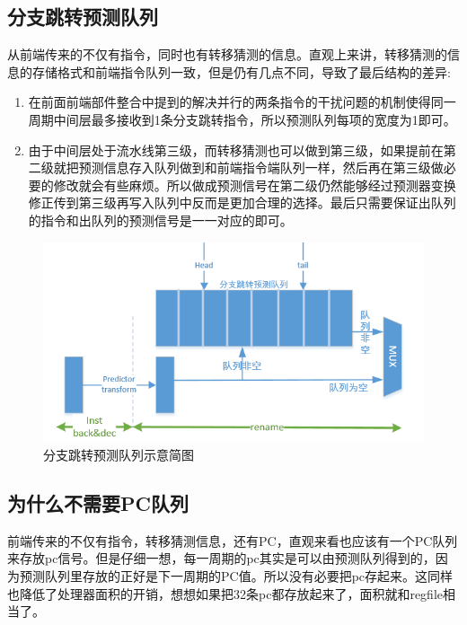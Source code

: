 \documentclass[11pt]{article}
\begin{document}
\subsection{分支跳转预测队列}
从前端传来的不仅有指令，同时也有转移猜测的信息。直观上来讲，转移猜测的信息的存储格式和前端指令队列一致，但是仍有几点不同，导致了最后结构的差异:
\begin{enumerate}
	\item 在前面前端部件整合中提到的解决并行的两条指令的干扰问题的机制使得同一周期中间层最多接收到1条分支跳转指令，所以预测队列每项的宽度为1即可。
	\item 由于中间层处于流水线第三级，而转移猜测也可以做到第三级，如果提前在第二级就把预测信息存入队列做到和前端指令端队列一样，然后再在第三级做必要的修改就会有些麻烦。所以做成预测信号在第二级仍然能够经过预测器变换修正传到第三级再写入队列中反而是更加合理的选择。最后只需要保证出队列的指令和出队列的预测信号是一一对应的即可。
\end{enumerate}
\begin{figure}[H]
	\centering
	\includegraphics[width=0.7\linewidth]{figs/predqueue.png}
	\caption{分支跳转预测队列示意简图}
\end{figure}
\subsection{为什么不需要PC队列}
前端传来的不仅有指令，转移猜测信息，还有PC，直观来看也应该有一个PC队列来存放pc信号。但是仔细一想，每一周期的pc其实是可以由预测队列得到的，因为预测队列里存放的正好是下一周期的PC值。所以没有必要把pc存起来。这同样也降低了处理器面积的开销，想想如果把32条pc都存放起来了，面积就和regfile相当了。
\end{document}
